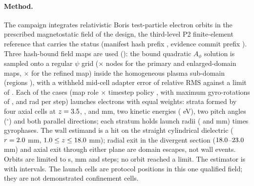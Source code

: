 \paragraph{Method.}
The campaign integrates relativistic Boris test-particle electron orbits in the
prescribed magnetostatic field of the \texttt{\WlfPTwoDesign} design, the third-level
P2 finite-element reference that carries the \texttt{\WlfPTwoQualification} status
(manifest hash prefix \texttt{\WlfPTwoManifestSha}, evidence commit prefix
\texttt{\WlfPTwoCommit}). Three hash-bound field maps are used
(\WlfMapRoleList): the bound quadratic $A_\phi$ solution is sampled onto a regular
$\psi$ grid (\WlfPrimaryGrid$\times$\WlfPrimaryGridAxial{} nodes for the primary and
enlarged-domain maps, \WlfRefinedGrid$\times$\WlfRefinedGridAxial{} for the refined
map) inside the homogeneous plasma sub-domain (regions \WlfPlasmaRegions), with a
withheld mid-cell adapter error of \WlfPrimaryAdapterRms{} relative RMS against a
limit of \WlfAdapterRmsLimit. Each of the \WlfCaseCount{} cases (map role $\times$
timestep policy \WlfPolicyList, with maximum gyro-rotations of \WlfPolicyN,
\WlfPolicyTwoN{} and \WlfPolicyFourN{} rad per step) launches \WlfLaunchesPerCase{}
electrons with equal weights: \WlfStrataPerCase{} strata formed by four axial cells
at $z = 3.5$, \WlfCellTwoZMm, \WlfCellThreeZMm{} and \WlfCellFourZMm{} mm,
two kinetic energies (\WlfEnergies{} eV), two pitch angles (\WlfPitches$^\circ$) and
both parallel directions; each stratum holds \WlfRepeatsPerStratum{} launch radii
(\WlfRadiusInnerMm{} and \WlfRadiusOuterMm{} mm) times \WlfGyrophaseCount{}
gyrophases. The wall estimand is a hit on the straight cylindrical dielectric
($r = 2.0$ mm, $1.0 \le z \le 18.0$ mm); radial exit
in the divergent section ($18.0$--$23.0$ mm) and axial exit
through either plane are domain escapes, not wall events. Orbits are limited to
\WlfMaxTimeS{} s, \WlfMaxPathMm{} mm and \WlfMaxSteps{} steps; no orbit reached a
limit. The estimator is \texttt{\WlfEstimatorPolicy} with \texttt{\WlfIntervalMethod}
intervals. The launch cells are protocol positions in this one qualified field; they
are not demonstrated confinement cells.

